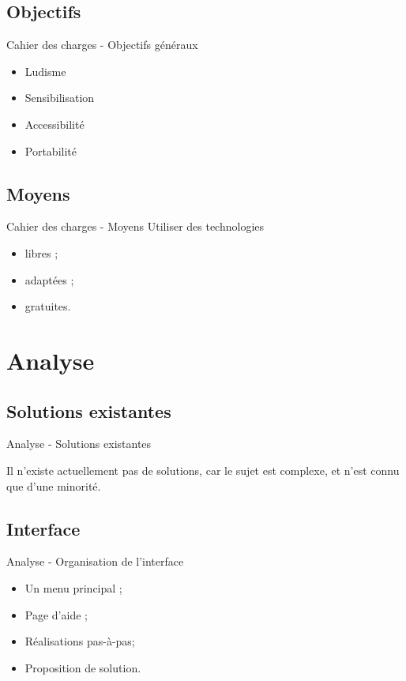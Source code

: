 \documentclass[xcolor=dvipsnames]{beamer}
\begin{document}
	\subsection{Objectifs}
		\begin{frame}{Cahier des charges - Objectifs généraux}
			\begin{itemize}\setlength{\itemsep}{0.75cm}
                \item Ludisme
                \item Sensibilisation
                \item Accessibilité
                \item Portabilité
			\end{itemize}
		\end{frame}
	\subsection{Moyens}
		\begin{frame}{Cahier des charges - Moyens}
		    Utiliser des technologies
			\begin{itemize}
				\item libres ;
				\item adaptées ;
				\item gratuites.
			\end{itemize}
		\end{frame}
\section{Analyse}
	\subsection{Solutions existantes}
		\begin{frame}{Analyse - Solutions existantes }
		\begin{center}
		Il n'existe actuellement pas de solutions,
		car le sujet est complexe, et n'est connu que d'une minorité.
		\end{center}
		\end{frame}
	\subsection{Interface}
		\begin{frame}{Analyse - Organisation de l'interface}
			\begin{itemize}
				\setlength{\itemsep}{0.5cm}
				\item Un menu principal ;
				\item Page d'aide ;
				\item Réalisations pas-à-pas;
				\item Proposition de solution.
			\end{itemize}
		\end{frame}
\end{document}
